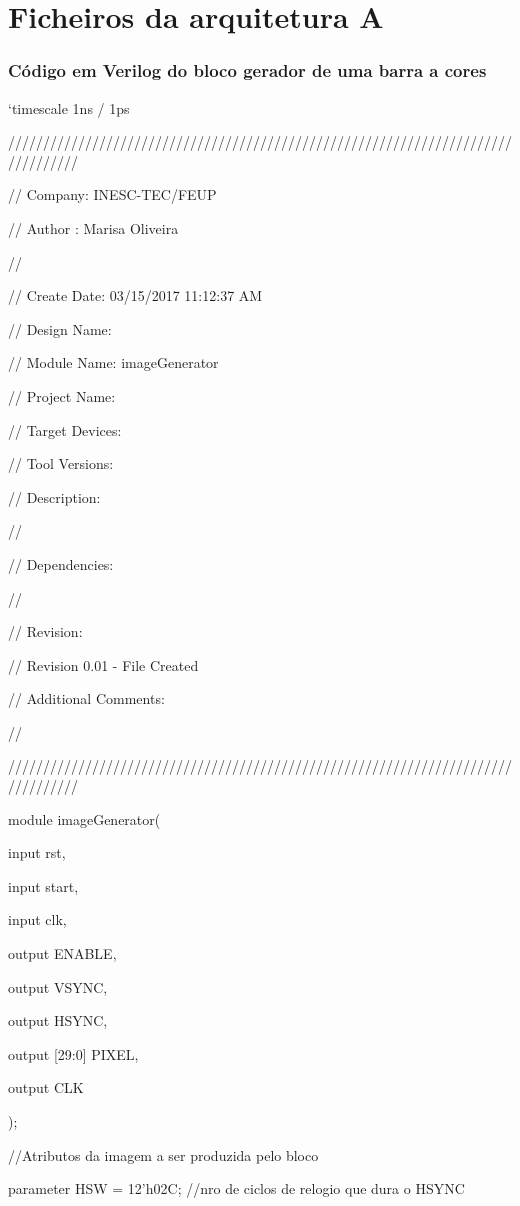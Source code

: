 \chapter{Ficheiros da arquitetura A} \label{ap2:codigo}



\subsection{Código em Verilog do bloco gerador de uma barra a cores}
`timescale 1ns / 1ps

//////////////////////////////////////////////////////////////////////////////////

// Company: INESC-TEC/FEUP

// Author : Marisa Oliveira

// 

// Create Date: 03/15/2017 11:12:37 AM

// Design Name: 

// Module Name: imageGenerator

// Project Name: 

// Target Devices: 

// Tool Versions: 

// Description: 

// 

// Dependencies: 

// 

// Revision:

// Revision 0.01 - File Created

// Additional Comments:

// 

//////////////////////////////////////////////////////////////////////////////////

module imageGenerator(

\quad input rst,
	
\quad input start,
	
\quad input clk,
	
\quad output ENABLE,
	
\quad output VSYNC,
	
\quad output HSYNC,
	
\quad output [29:0] PIXEL,
	
\quad output CLK
	
);

\quad //Atributos da imagem a ser produzida pelo bloco

\quad parameter    HSW = 12'h02C;    //nro de ciclos de relogio que dura o HSYNC

